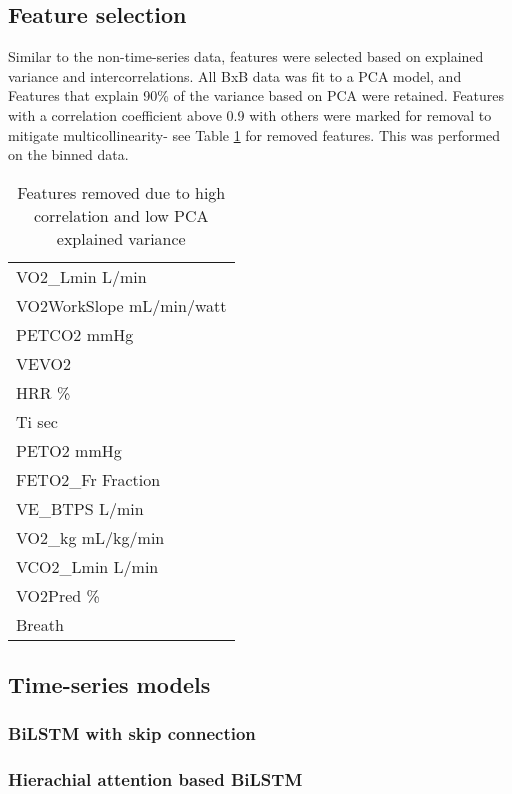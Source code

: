 \documentclass{article}
\begin{document}
\subsection{Feature selection}

Similar to the non-time-series data, features were selected based on explained variance and intercorrelations. All BxB data was fit to a PCA model, and Features that explain 90\% of the variance based on PCA were retained. Features with a correlation coefficient above 0.9 with others were marked for removal to mitigate multicollinearity- see Table \ref{tab:correlation-matrix} for removed features. This was performed on the binned data.

\begin{table}[htbp]
    \centering
    \caption{Features removed due to high correlation and low PCA explained variance}
    \begin{tabular}{l}
        VO2\_Lmin L/min          \\
        VO2WorkSlope mL/min/watt \\
        PETCO2 mmHg              \\
        VEVO2                    \\
        HRR \%                   \\
        Ti sec                   \\
        PETO2 mmHg               \\
        FETO2\_Fr Fraction       \\
        VE\_BTPS L/min           \\
        VO2\_kg mL/kg/min        \\
        VCO2\_Lmin L/min         \\
        VO2Pred \%               \\
        Breath                   \\
    \end{tabular}
    \label{tab:correlation-matrix}
\end{table}

\subsection{Time-series models}

\subsubsection{BiLSTM with skip connection}

\subsubsection{Hierachial attention based BiLSTM}
\end{document}
